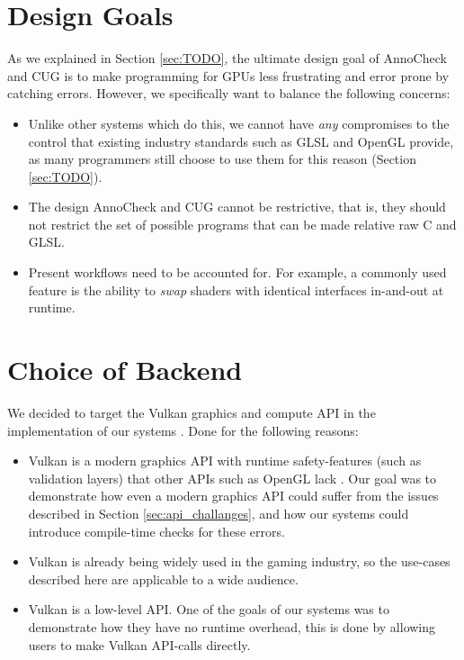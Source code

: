 \documentclass[a4paper,12pt,twoside,openright]{report}
\begin{document}
\section{Design Goals}

As we explained in Section \ref{sec:TODO}, the ultimate design goal of
AnnoCheck and CUG is to make programming for GPUs less frustrating and error
prone by catching errors. However, we specifically want to balance the following
concerns:

\begin{itemize}

    \item Unlike other systems which do this, we cannot have \textit{any}
    compromises to the control that existing industry standards such as GLSL
    and OpenGL provide, as many programmers still choose to use them for this
    reason (Section \ref{sec:TODO}).

    \item The design AnnoCheck and CUG cannot be restrictive, that is, they
    should not restrict the set of possible programs that can be made relative
    raw C and GLSL.

    \item Present workflows need to be accounted for. For example, a commonly
    used feature is the ability to \textit{swap} shaders with identical
    interfaces in-and-out at runtime.

\end{itemize}

\section{Choice of Backend}


We decided to target the Vulkan graphics and compute API in the implementation
of our systems \cite{Vulkan}. Done for the following reasons:

\begin{itemize}

    \item Vulkan is a modern graphics API with runtime safety-features (such as
    validation layers) that other APIs such as OpenGL lack \cite{TODO}. Our
    goal was to demonstrate how even a modern graphics API could suffer from
    the issues described in Section \ref{sec:api_challanges}, and how our
    systems could introduce compile-time checks for these errors.

    \item Vulkan is already being widely used in the gaming industry, so the
    use-cases described here are applicable to a wide audience.

    \item Vulkan is a low-level API. One of the goals of our systems was to
    demonstrate how they have no runtime overhead, this is done by allowing
    users to make Vulkan API-calls directly.

\end{itemize}
\end{document}
